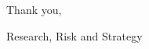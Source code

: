 \documentclass[11pt,pressrelease]{newlfm} %
\begin{document}
\begin{newlfm}
\begin{singlespace}
\begin{enumerate}

\end{enumerate}


Thank you, \par
Research, Risk and Strategy


\end{singlespace} %



\end{newlfm}
\end{document}
